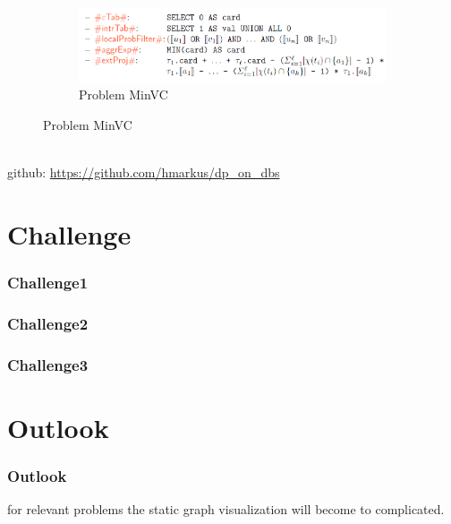 \documentclass[c,8pt,xcolor...,x11names]{beamer}
\begin{document}
\begin{frame}
\begin{minipage}{0.54\textwidth}
\begin{figure}
\begin{subfigure}[b]{\textwidth}
			\end{subfigure}\hfill\\
			\begin{subfigure}[b]{\textwidth}
				\includegraphics[width=0.8\linewidth]{images/dpdbMinVC.png}
				\caption{Problem MinVC}

			\end{subfigure}
		\end{figure}

	\end{minipage}
	\medskip \\
	github: \url{https://github.com/hmarkus/dp_on_dbs}
\end{frame}


\section{Challenge}
\begin{frame}
	\frametitle{Challenge1}
	\medskip
	
\end{frame}

\begin{frame}
	\frametitle{Challenge2}
	\medskip
	
\end{frame}

\begin{frame}
	\frametitle{Challenge3}
	\medskip
	
\end{frame}

\section{Outlook}
\begin{frame}
	\frametitle{Outlook}
	\medskip
	for relevant problems the static graph visualization will become to complicated.

\end{frame}
\end{document}
